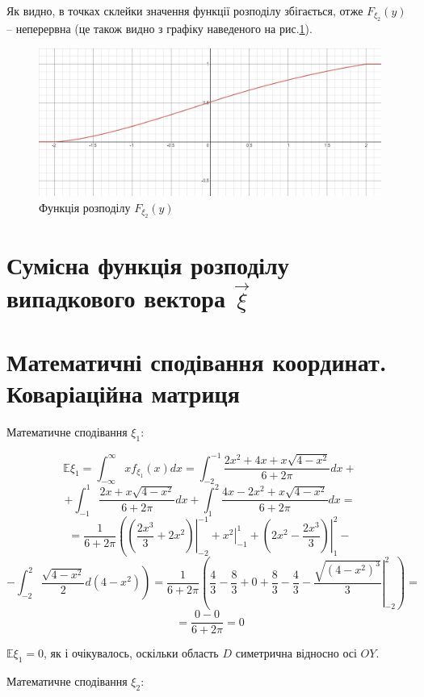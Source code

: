 \documentclass[14pt, a4paper, ukrainian]{extreport}
\begin{document}
		Як видно, в точках склейки значення функції розподілу збігається, отже $F_{\xi_2}(y)$ -- неперервна (це також видно з графіку наведеного на рис.\ref{im:F2}).
		
		\begin{figure}[H]
			\centering
			\includegraphics[width=\textwidth]{./Image/Im_09_F2.png}
			\caption{Функція розподілу $F_{\xi_2}(y)$}
			\label{im:F2}
		\end{figure}
	
	
	\section{Сумісна функція розподілу випадкового вектора $\vec\xi$}
	
	
	\section{Математичні сподівання координат. Коваріаційна матриця}
	
	Математичне сподівання $\xi_1$:
	
	$$\mathbb{E}\xi_1 = \int_{-\infty}^{\infty}xf_{\xi_1}(x)dx = \int_{-2}^{-1}\frac{2x^2 + 4x + x\sqrt{4-x^2}}{6+2\pi}dx +
	$$
	$$ + \int_{-1}^{1}\frac{2x + x\sqrt{4-x^2}}{6+2\pi}dx + \int_{1}^{2}\frac{4x-2x^2 + x\sqrt{4-x^2}}{6+2\pi}dx =
	$$
	$$ = \frac{1}{6+2\pi}\left(\left.\left(\frac{2x^3}{3} + 2x^2 \right)\right|_{-2}^{-1} + \left.{x^2}\right|_{-1}^{1} + \left.\left(2x^2 - \frac{2x^3}{3}\right)\right|_{1}^{2} - \right.$$
	$$ - \left.\int_{-2}^{2}\frac{\sqrt{4-x^2}}{2}d(4-x^2)\right) = 
	\frac{1}{6+2\pi} \left(\frac{4}{3} - \frac{8}{3} + 0 + \frac{8}{3} - \frac{4}{3} - \left. \frac{\sqrt{(4-x^2)^3}}{3}\right|_{-2}^2\right) =
	$$
	$$ = \frac{0 - 0}{6 + 2\pi} = 0
	$$
	
	$\mathbb{E}\xi_1 = 0$, як і очікувалось, оскільки область $D$ симетрична відносно осі $OY$.
	
	
	Математичне сподівання $\xi_2$:
	
\end{document}
